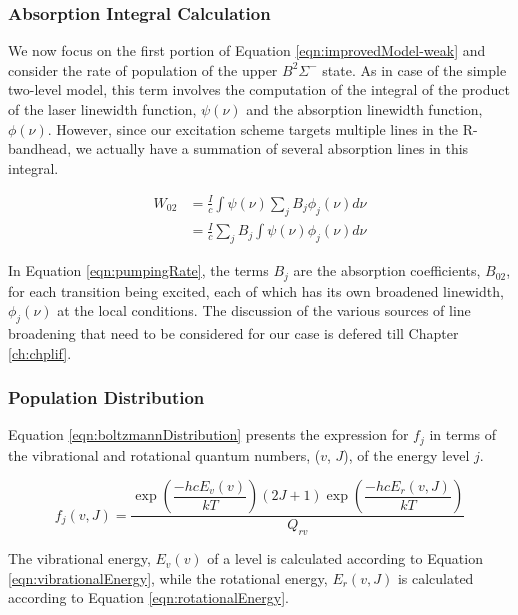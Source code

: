 \subsubsection{Absorption Integral Calculation}
\label{subsubsec:improved-model-absorption-integral-calculation}

We now focus on the first portion of Equation \ref{eqn:improvedModel-weak} and consider the rate of population of the upper \(B^2\Sigma^-\) state.
As in case of the simple two-level model, this term involves the computation of the integral of the product of the laser linewidth function, \(\psi(\nu)\) and the absorption linewidth function, \(\phi(\nu)\).
However, since our excitation scheme targets multiple lines in the R-bandhead, we actually have a summation of several absorption lines in this integral.

\begin{align}
  W_{02} & = \frac{I}{c} \int \psi(\nu) \sum_j B_j \phi_j (\nu) d\nu \nonumber \\
        & = \frac{I}{c} \sum_j B_j \int \psi(\nu)\phi_j(\nu) d\nu
  \label{eqn:pumpingRate}
\end{align}

In Equation \ref{eqn:pumpingRate}, the terms \(B_j\) are the absorption coefficients, \(B_{02}\), for each transition being excited, each of which has its own broadened linewidth, \(\phi_j(\nu)\) at the local conditions.
The discussion of the various sources of line broadening that need to be considered for our case is defered till Chapter \ref{ch:chplif}.

\subsubsection{Population Distribution}
\label{subsubsec:improved-model-population-distribution}

Equation \ref{eqn:boltzmannDistribution} presents the expression for \(f_j\) in terms of the vibrational and rotational quantum numbers, (\(v\), \(J\)), of the energy level \(j\).

\begin{equation}
  f_j(v,J) = \frac{ \exp{\left(\dfrac{-hcE_v(v)}{kT}\right)} (2J + 1)\exp{\left(\dfrac{-hcE_r(v, J)}{kT}\right)} }{ Q_{rv} }
  \label{eqn:boltzmannDistribution}
\end{equation}

The vibrational energy, \(E_v(v)\) of a level is calculated according to Equation \ref{eqn:vibrationalEnergy}, while the rotational energy, \(E_r(v,J)\) is calculated according to Equation \ref{eqn:rotationalEnergy}.

